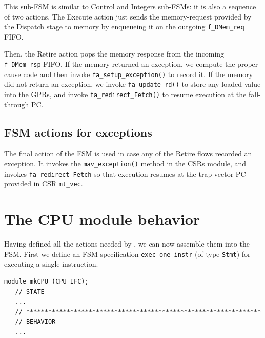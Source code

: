 This sub-FSM is similar to Control and Integers sub-FSMs: it is also a
sequence of two actions.  The Execute action just sends the
memory-request provided by the Dispatch stage to memory by enqueueing
it on the outgoing \verb|f_DMem_req| FIFO.


Then, the Retire action pops the memory response from the incoming
\verb|f_DMem_rsp| FIFO.  If the memory returned an exception, we
compute the proper cause code and then invoke
\verb|fa_setup_exception()| to record it.  If the memory did not
return an exception, we invoke \verb|fa_update_rd()| to store any
loaded value into the GPRs, and invoke \verb|fa_redirect_Fetch()| to
resume execution at the fall-through PC.



\subsection{FSM actions for exceptions}

The final action of the {\DRUM} FSM is used in case any of the Retire
flows recorded an exception.  It invokes the \verb|mav_exception()|
method in the CSRs module, and invokes \verb|fa_redirect_Fetch| so
that execution resumes at the trap-vector PC provided in CSR
\verb|mt_vec|.



\section{The {\DRUM} CPU module behavior}

\label{Sec_Drum_CPU_module_behavior}


Having defined all the actions needed by {\DRUM}, we can now assemble
them into the {\DRUM} FSM.  First we define an FSM specification
\verb|exec_one_instr| (of type \verb|Stmt|) for executing a single
instruction.

{\footnotesize
\begin{Verbatim}
module mkCPU (CPU_IFC);
   // STATE
   ...
   // ****************************************************************
   // BEHAVIOR
   ...
\end{Verbatim}
}

